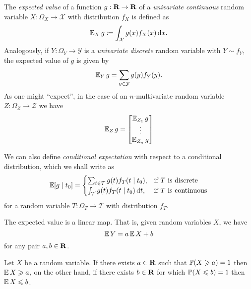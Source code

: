 \begin{definition}
    \label{def:expected-value}
    The \emph{expected value} of a function \(g: \mathbf{R} \to \mathbf{R}\) of a \emph{univariate
        continuous} random variable \(X: \Omega_X \to \mathcal{X}\) with distribution
    \(f_X\) is defined as
    \[
        \operatorname{\mathbb{E}}_X g \coloneq \int_{\mathcal{X}} g(x) f_X(x)\, \mathrm{d} x.
    \]
    Analogously, if \(Y: \Omega_Y \to \mathcal{Y}\) is a \emph{univariate discrete}
    random variable with \(Y \sim f_Y\), the expected value of \(g\) is given by
    \[
        \operatorname{\mathbb{E}}_Y g = \sum_{y \in \mathcal{Y}} g(y) f_Y(y).
    \]
    As one might ``expect'', in the case of an \(n\)-multivariate random variable
    \(Z: \Omega_Z \to \mathcal{Z}\) we have
    \[
        \operatorname{\mathbb{E}}_Z g =
        \begin{bmatrix}
            \operatorname{\mathbb{E}}_{Z_1} g \\
            \vdots          \\
            \operatorname{\mathbb{E}}_{Z_n} g
        \end{bmatrix}
    \]

    We can also define \emph{conditional expectation} with respect to a conditional
    distribution, which we shall write as
    \[
        \operatorname{\mathbb{E}}[g \mid t_0] =
        \begin{cases}
            \sum_{t \in \mathcal{T}} g(t) f_T(t \mid t_0),     & \text{if } T \text{ is discrete}   \\
            \int_{\mathcal{T}} g(t) f_T(t \mid t_0)\, \mathrm{d} t, & \text{if } T \text{ is continuous}
        \end{cases}
    \]
    for a random variable \(T: \Omega_T \to \mathcal{T}\) with distribution \(f_T\).
\end{definition}

\begin{corollary}
    \label{cor:expected-value-is-linear}
    The expected value is a linear map. That is, given random variables \(X\), we
    have
    \[
        \operatorname{\mathbb{E}} Y = a \operatorname{\mathbb{E}} X + b
    \]
    for any pair \(a, b \in \mathbf{R}\).
\end{corollary}

\begin{proposition}
    \label{prop:bound-expectation}
    Let \(X\) be a random variable. If there exists \(a \in \mathbf{R}\) such that \(\operatorname{\mathbb{P}}(X \geqslant
    a) = 1\) then \(\operatorname{\mathbb{E}} X \geqslant a\), on the other hand, if there exists \(b \in \mathbf{R}\)
    for which \(\operatorname{\mathbb{P}}(X \leqslant b) = 1\) then \(\operatorname{\mathbb{E}} X \leqslant b\).
\end{proposition}

